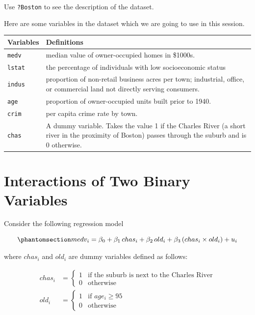 \documentclass[
  12pt,
  letterpaper,
]{scrbook}
\theoremstyle{definition}
\theoremstyle{plain}
\theoremstyle{remark}
\begin{document}
Use \texttt{?Boston} to see the description of the dataset.

Here are some variables in the dataset which we are going to use in this
session.

\begin{longtable}[]{@{}
  >{\raggedright\arraybackslash}p{}
  >{\raggedright\arraybackslash}p{}@{}}
\toprule\noalign{}
\begin{minipage}[b]{\linewidth}\raggedright
Variables
\end{minipage} & \begin{minipage}[b]{\linewidth}\raggedright
Definitions
\end{minipage} \\
\midrule\noalign{}
\endhead
\bottomrule\noalign{}
\endlastfoot
\texttt{medv} & median value of owner-occupied homes in \$1000s. \\
\texttt{lstat} & the percentage of individuals with low socioeconomic
status \\
\texttt{indus} & proportion of non-retail business acres per town;
industrial, office, or commercial land not directly serving
consumers. \\
\texttt{age} & proportion of owner-occupied units built prior to
1940. \\
\texttt{crim} & per capita crime rate by town. \\
\texttt{chas} & A dummy variable. Takes the value 1 if the Charles River
(a short river in the proximity of Boston) passes through the suburb and
is 0 otherwise. \\
\end{longtable}

\section{Interactions of Two Binary
Variables}\label{interactions-of-two-binary-variables}

Consider the following regression model

\begin{equation}\phantomsection\label{eq-binary-interaction}{
medv_i = \beta_0 + \beta_1\, chas_i + \beta_2\, old_i + \beta_3\, (chas_i \times old_i) + u_i
}\end{equation}

where \(chas_i\) and \(old_i\) are dummy variables defined as follows:

\[
\begin{aligned}
chas_i &= \begin{cases}
1 & \text{if the suburb is next to the Charles River} \\
0 & \text{otherwise}
\end{cases} \\
old_i &= \begin{cases}
1 & \text{if } age_i \ge 95 \\
0 & \text{otherwise}
\end{cases}
\end{aligned}
\]
\end{document}
